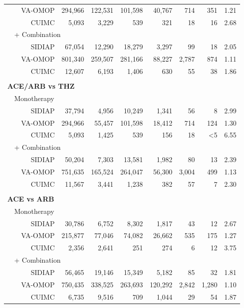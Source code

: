 \documentclass[11pt,]{article}
\begin{document}
\begin{longtable}{p{-2em}p{-2em}rrrrrrrr}
   &  & VA-OMOP & 294,966 & 122,531 & 101,598 & 40,767 & 714 & 351 & 1.21 \\ 
   &  & CUIMC & 5,093 & 3,229 & 539 & 321 & 18 & 16 & 2.68 \\ 
                           & \multicolumn{8}{l}{+ Combination} \\ &  & SIDIAP & 67,054 & 12,290 & 18,279 & 3,297 & 99 & 18 & 2.05 \\ 
   &  & VA-OMOP & 801,340 & 259,507 & 281,166 & 88,227 & 2,787 & 874 & 1.11 \\ 
   &  & CUIMC & 12,607 & 6,193 & 1,406 & 630 & 55 & 38 & 1.86 \\ 
   \rowcolor{white} \\ \multicolumn{9}{l}{\textbf{ACE/ARB vs THZ}} \\ & \multicolumn{9}{l}{Monotherapy}  \\ &  & SIDIAP & 37,794 & 4,956 & 10,249 & 1,341 & 56 & 8 & 2.99 \\ 
   &  & VA-OMOP & 294,966 & 55,457 & 101,598 & 18,412 & 714 & 124 & 1.30 \\ 
   &  & CUIMC & 5,093 & 1,425 & 539 & 156 & 18 & <5 & 6.55 \\ 
                           & \multicolumn{8}{l}{+ Combination} \\ &  & SIDIAP & 50,204 & 7,303 & 13,581 & 1,982 & 80 & 13 & 2.39 \\ 
   &  & VA-OMOP & 751,635 & 165,524 & 264,047 & 56,300 & 3,004 & 499 & 1.13 \\ 
   &  & CUIMC & 11,567 & 3,441 & 1,238 & 382 & 57 & 7 & 2.30 \\ 
   \rowcolor{white} \\ \multicolumn{9}{l}{\textbf{ACE vs ARB}} \\ & \multicolumn{9}{l}{Monotherapy}  \\ &  & SIDIAP & 30,786 & 6,752 & 8,302 & 1,817 & 43 & 12 & 2.67 \\ 
   &  & VA-OMOP & 215,877 & 77,046 & 74,082 & 26,662 & 535 & 175 & 1.27 \\ 
   &  & CUIMC & 2,356 & 2,641 & 251 & 274 & 6 & 12 & 3.75 \\ 
                           & \multicolumn{8}{l}{+ Combination} \\ &  & SIDIAP & 56,465 & 19,146 & 15,349 & 5,182 & 85 & 32 & 1.81 \\ 
   &  & VA-OMOP & 750,435 & 338,525 & 263,693 & 120,292 & 2,842 & 1,280 & 1.10 \\ 
   &  & CUIMC & 6,735 & 9,516 & 709 & 1,044 & 29 & 54 & 1.87 \\ 

\end{longtable}
\end{document}
